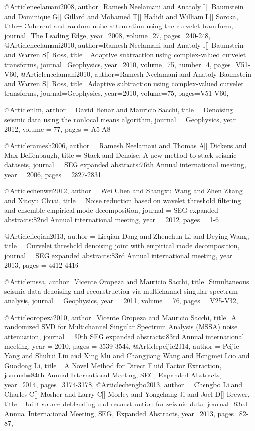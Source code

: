 {@Article{neelamani2008,
  author={Ramesh Neelamani and Anatoly I[] Baumstein and Dominique G[] Gillard and Mohamed T[] Hadidi and William L[] Soroka},
  title={	
Coherent and random noise attenuation using the curvelet transform},
  journal={The Leading Edge},
  year=2008,
  volume=27,
  pages={240-248},
}
@Article{neelamani2010,
  author={Ramesh Neelamani and Anatoly I[] Baumstein and Warren S[] Ross},
  title={		
Adaptive subtraction using complex-valued curvelet transforms},
  journal={Geophysics},
  year=2010,
  volume=75,
  number=4,
  pages={V51-V60},
}
@Article{neelamani2010,
  author={Ramesh Neelamani and Anatoly Baumstein and Warren S[] Ross},
  title={Adaptive subtraction using complex-valued curvelet transforms},
  journal={Geophysics},
  year=2010,
  volume=75,
  pages={V51-V60},
}


@Article{nlm,
  author = 	 {David Bonar and Mauricio Sacchi},
  title = 	 {Denoising seismic data using the nonlocal means algorithm},
  journal = 	 {Geophysics},
  year = 	 2012,
  volume =	 77,
  pages =	 {A5-A8}
}

@Article{ramesh2006,
  author = 	 {Ramesh Neelamani and Thomas A[] Dickens and Max Deffenbaugh},
  title = 	 {	
Stack‐and‐Denoise: A new method to stack seismic datasets},
  journal = 	 {SEG expanded abstracts:76th Annual international meeting},
  year = 	 2006,
  pages =	 {2827-2831}
}

@Article{chenwei2012,
  author = 	 {Wei Chen and Shangxu Wang and Zhen Zhang and Xiaoyu Chuai},
  title = 	 {Noise reduction based on wavelet threshold filtering and ensemble empirical mode decomposition},
  journal = 	 {SEG expanded abstracts:82nd Annual international meeting},
  year = 	 2012,
  pages =	 {1-6}
}

@Article{lieqian2013,
  author = 	 {Lieqian Dong and Zhenchun Li and Deying Wang},
  title = 	 {Curvelet threshold denoising joint with empirical mode decomposition},
  journal = 	 {SEG expanded abstracts:83rd Annual international meeting},
  year = 	 2013,
  pages =	 {4412-4416}
}



@Article{mssa,
  author={Vicente Oropeza and Mauricio Sacchi},
  title={Simultaneous seismic data denoising and reconstruction via multichannel singular spectrum analysis},
  journal = 	 {Geophysics},
  year = 	 2011,
  volume =	 76,
  pages =	 {V25-V32},
}

@Article{oropeza2010,
  author={Vicente Oropeza and Mauricio Sacchi},
  title={A randomized SVD for Multichannel Singular Spectrum Analysis (MSSA) noise attenuation},
  journal = 	 {80th SEG expanded abstracts:83rd Annual international meeting},
  year = 	 2010,
  pages =	 {3539-3544},
}
@Article{peijie2014,
  author = {Peijie Yang and Shuhui Liu and Xing Mu and Changjiang Wang and Hongmei Luo and Guodong Li},
  title ={A Novel Method for Direct Fluid Factor Extraction},
  journal={84th Annual International Meeting, SEG, Expanded Abstracts},
  year=2014,
  pages={3174-3178},
}
@Article{chengbo2013,
  author = {Chengbo Li and Charles C[] Mosher and Larry C[] Morley and Yongchang Ji and Joel D[] Brewer},
  title ={Joint source deblending and reconstruction for seismic data},
  journal={83rd Annual International Meeting, SEG, Expanded Abstracts},
  year=2013,
  pages={82-87},
}

}
